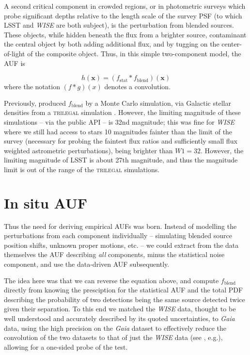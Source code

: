 \documentclass[fleqn,usenatbib]{mnras}
\begin{document}
A second critical component in crowded regions, or in photometric surveys which probe significant depths relative to the length scale of the survey PSF (to which LSST and \textit{WISE} are both subject), is the perturbation from blended sources. These objects, while hidden beneath the flux from a brighter source, contaminant the central object by both adding additional flux, and by tugging on the center-of-light of the composite object. Thus, in this simple two-component model, the AUF is

\begin{equation}
h(\textbf{x}) = (f_\mathrm{stat} * f_\mathrm{blend})(\textbf{x})
\end{equation}
where the notation $(f * g)(x)$ denotes a convolution.

Previously, \citet{2018MNRAS.481.2148W} produced $f_\mathrm{blend}$ by a Monte Carlo simulation, via Galactic stellar densities from a \textsc{trilegal} simulation \citep{Girardi2005}. However, the limiting magnitude of these simulations -- via the public API -- is 32nd magnitude; this was fine for \textit{WISE} where we still had access to stars 10 magnitudes fainter than the limit of the survey (necessary for probing the faintest flux ratios and sufficiently small flux weighted astrometric perturbations), being brighter than $W1=32$. However, the limiting magnitude of LSST is about 27th magnitude, and thus the magnitude limit is out of the range of the \textsc{trilegal} simulations.

\section{In situ AUF}
Thus the need for deriving empirical AUFs was born. Instead of modelling the perturbations from each component individually -- simulating blended source position shifts, unknown proper motions, etc. -- we could extract from the data themselves the AUF describing \textit{all} components, minus the statistical noise component, and use the data-driven AUF subsequently.

The idea here was that we can reverse the equation above, and compute $f_\mathrm{blend}$ directly from knowing the presciption for the statistical AUF and the total PDF describing the probability of two detections being the same source detected twice given their separation. To this end we matched the \textit{WISE} data, thought to be well understood and accurately described by its quoted uncertainties, to \textit{Gaia} data, using the high precision on the \textit{Gaia} dataset to effectively reduce the convolution of the two datasets to that of just the \textit{WISE} data (see \citealt{2017MNRAS.468.2517W}, e.g.), allowing for a one-sided probe of the test.
\end{document}
